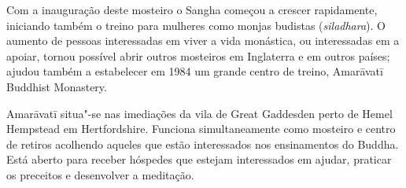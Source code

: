 \enlargethispage{\baselineskip}

Com a inauguração deste mosteiro o Sangha começou a crescer rapidamente,
iniciando também o treino para mulheres como monjas budistas (\emph{siladhara}).
O aumento de pessoas interessadas em viver a vida monástica, ou interessadas em
a apoiar, tornou possível abrir outros mosteiros em Inglaterra e em outros
países; ajudou também a estabelecer em 1984 um grande centro de treino,
Amarāvatī Buddhist Monastery.

Amarāvatī situa"-se nas imediações da vila de Great Gaddesden perto de Hemel
Hempstead em Hertfordshire. Funciona simultaneamente como mosteiro e centro de
retiros acolhendo aqueles que estão interessados nos ensinamentos do Buddha. Está
aberto para receber hóspedes que estejam interessados em ajudar, praticar os preceitos 
e desenvolver a meditação.

